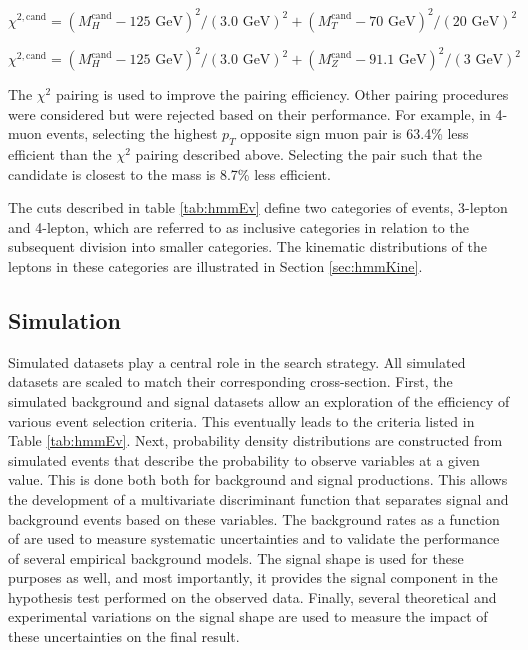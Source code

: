 \begin{equation}
  \label{eq:hmmWhPairing}
  \chi^{2,\text{cand}} = (M_H^\text{cand}-125\text{ GeV})^2/(3.0\text{ GeV})^2 + (M_T^\text{cand}-70\text{ GeV} )^2/(20\text{ GeV})^2
\end{equation}

\begin{equation}
  \label{eq:hmmZhPairing}
  \chi^{2,\text{cand}} = (M_H^\text{cand}-125\text{ GeV})^2/(3.0\text{ GeV})^2 + (M_Z^\text{cand}-91.1\text{ GeV} )^2/(3\text{ GeV})^2
\end{equation}

The $\chi^2$ pairing is used to improve the pairing efficiency.
Other pairing procedures were considered but were rejected based on their performance.
For example, in 4-muon events, selecting the highest $p_T$ opposite sign muon pair is 63.4\% less efficient than the $\chi^2$ pairing described above. 
Selecting the pair such that the \Z candidate is closest to the \Z mass is 8.7\% less efficient.

The cuts described in table \ref{tab:hmmEv} define two categories of events, 3-lepton and 4-lepton, which are referred to as inclusive categories in relation to the subsequent division into smaller categories.
The kinematic distributions of the leptons in these categories are illustrated in Section \ref{sec:hmmKine}.

\subsection{Simulation}\label{sec:hmmSim}

Simulated datasets play a central role in the search strategy.
All simulated datasets are scaled to match their corresponding cross-section.\cite{CERNYellowReport4}
First, the simulated background and signal datasets allow an exploration of the efficiency of various event selection criteria.
This eventually leads to the criteria listed in Table \ref{tab:hmmEv}.
Next, probability density distributions are constructed from simulated events that describe the probability to observe variables at a given value.
This is done both both for background and signal productions.
This allows the development of a multivariate discriminant function that separates signal and background events based on these variables.
The background rates as a function of \muu are used to measure systematic uncertainties and to validate the performance of several empirical background models.
The signal shape is used for these purposes as well, and most importantly, it provides the signal component in the hypothesis test performed on the observed data.
Finally, several theoretical and experimental variations on the signal shape are used to measure the impact of these uncertainties on the final result.

